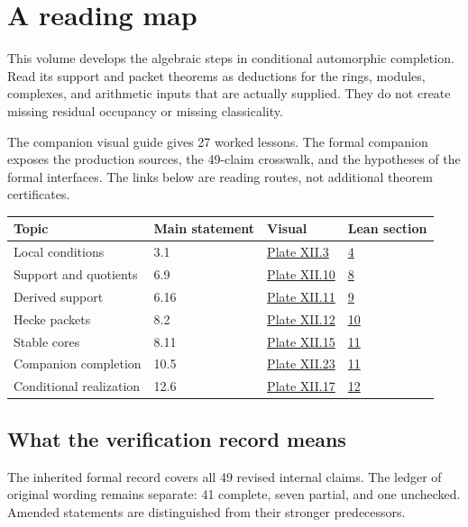 \section*{A reading map}
This volume develops the algebraic steps in conditional automorphic completion. Read its support and packet theorems as deductions for the rings, modules, complexes, and arithmetic inputs that are actually supplied. They do not create missing residual occupancy or missing classicality.

The companion visual guide gives 27 worked lessons. The formal companion exposes the production sources, the 49-claim crosswalk, and the hypotheses of the formal interfaces. The links below are reading routes, not additional theorem certificates.

\begin{center}\begin{tabular}{>{\raggedright\arraybackslash}p{.30\linewidth}lll}\toprule
Topic & Main statement & Visual & Lean section\\\midrule
Local conditions & 3.1 & \href{p12-route:main-v-3}{Plate XII.3} & \href{p12-route:main-l-3.1}{4}\\
Support and quotients & 6.9 & \href{p12-route:main-v-10}{Plate XII.10} & \href{p12-route:main-l-6.9}{8}\\
Derived support & 6.16 & \href{p12-route:main-v-11}{Plate XII.11} & \href{p12-route:main-l-6.16}{9}\\
Hecke packets & 8.2 & \href{p12-route:main-v-12}{Plate XII.12} & \href{p12-route:main-l-8.2}{10}\\
Stable cores & 8.11 & \href{p12-route:main-v-15}{Plate XII.15} & \href{p12-route:main-l-8.11}{11}\\
Companion completion & 10.5 & \href{p12-route:main-v-23}{Plate XII.23} & \href{p12-route:main-l-10.5}{11}\\
Conditional realization & 12.6 & \href{p12-route:main-v-17}{Plate XII.17} & \href{p12-route:main-l-12.6}{12}\\
\bottomrule\end{tabular}\end{center}
\subsection*{What the verification record means}
The inherited formal record covers all 49 revised internal claims. The ledger of original wording remains separate: 41 complete, seven partial, and one unchecked. Amended statements are distinguished from their stronger predecessors.

